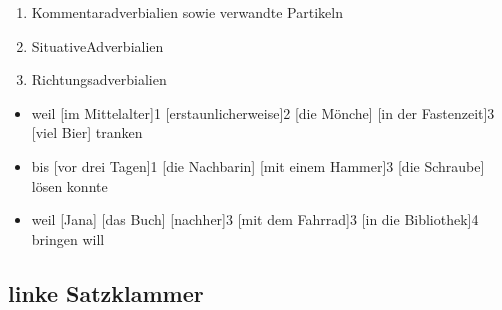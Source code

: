 \documentclass[UTF8]{report}
\begin{document}
\begin{enumerate}
\begin{enumerate}
        \item Kommentaradverbialien sowie verwandte Partikeln
        \item SituativeAdverbialien
        \item Richtungsadverbialien
    \end{enumerate}
    \begin{itemize}
        \item weil [im Mittelalter]1 [erstaunlicherweise]2 [die Mönche] [in der Fastenzeit]3 [viel Bier] tranken
        \item bis [vor drei Tagen]1 [die Nachbarin] [mit einem Hammer]3 [die Schraube] lösen konnte
        \item weil [Jana] [das Buch] [nachher]3 [mit dem Fahrrad]3 [in die Bibliothek]4 bringen will
    \end{itemize}
\end{enumerate}


\subsection{linke Satzklammer}
\end{document}
